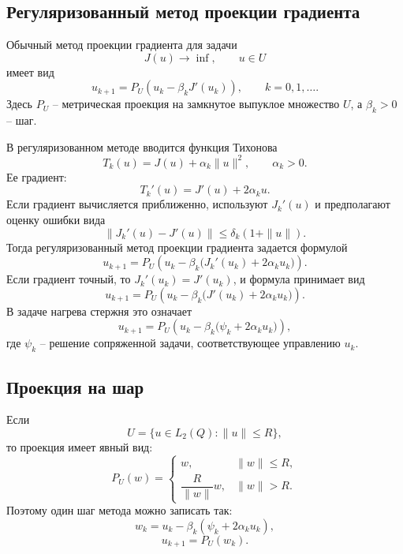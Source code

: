 \documentclass[12pt,a4paper]{article}
\begin{document}
\subsection*{Регуляризованный метод проекции градиента}
Обычный метод проекции градиента для задачи
\[
J(u)\to\inf,
\qquad u\in U
\]
имеет вид
\[
u_{k+1}=P_U\left(u_k-\beta_kJ'(u_k)\right),
\qquad k=0,1,\ldots .
\]
Здесь \(P_U\) -- метрическая проекция на замкнутое выпуклое множество \(U\), а \(\beta_k>0\) -- шаг.

В регуляризованном методе вводится функция Тихонова
\[
T_k(u)=J(u)+\alpha_k\|u\|^2,
\qquad \alpha_k>0.
\]
Ее градиент:
\[
T_k'(u)=J'(u)+2\alpha_k u.
\]
Если градиент вычисляется приближенно, используют \(J_k'(u)\) и предполагают оценку ошибки вида
\[
\|J_k'(u)-J'(u)\|\le \delta_k(1+\|u\|).
\]
Тогда регуляризованный метод проекции градиента задается формулой
\[
u_{k+1}=P_U\left(u_k-\beta_k\bigl(J_k'(u_k)+2\alpha_k u_k\bigr)\right).
\]
Если градиент точный, то \(J_k'(u_k)=J'(u_k)\), и формула принимает вид
\[
u_{k+1}=P_U\left(u_k-\beta_k\bigl(J'(u_k)+2\alpha_k u_k\bigr)\right).
\]
В задаче нагрева стержня это означает
\[
u_{k+1}=P_U\left(u_k-\beta_k\bigl(\psi_k+2\alpha_k u_k\bigr)\right),
\]
где \(\psi_k\) -- решение сопряженной задачи, соответствующее управлению \(u_k\).

\subsection*{Проекция на шар}
Если
\[
U=\{u\in L_2(Q):\|u\|\le R\},
\]
то проекция имеет явный вид:
\[
P_U(w)=
\begin{cases}
w, & \|w\|\le R,\\[2mm]
\dfrac{R}{\|w\|}w, & \|w\|>R.
\end{cases}
\]
Поэтому один шаг метода можно записать так:
\[
w_k=u_k-\beta_k(\psi_k+2\alpha_k u_k),
\]
\[
u_{k+1}=P_U(w_k).
\]
\end{document}
